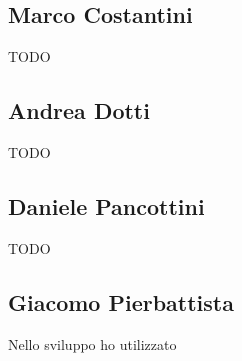 \documentclass[a4paper,12pt]{report}
\begin{document}
\subsection*{Marco Costantini}
{TODO}

\subsection*{Andrea Dotti}
{TODO}

\subsection*{Daniele Pancottini}
{TODO}

\subsection*{Giacomo Pierbattista}
Nello sviluppo ho utilizzato
\end{document}
